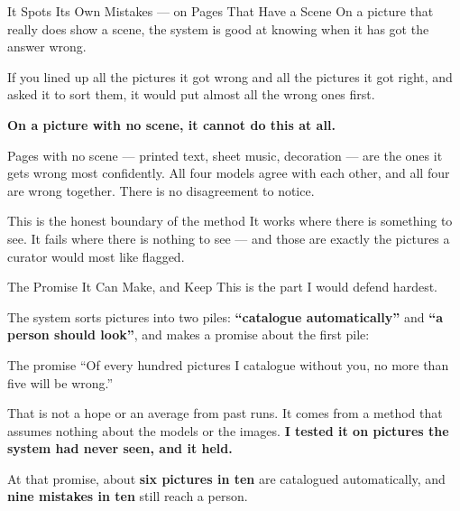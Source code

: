 \documentclass[aspectratio=169,11pt]{beamer}
\begin{document}
\begin{frame}{It Spots Its Own Mistakes --- on Pages That Have a Scene}
\normalsize
On a picture that really does show a scene, the system is good at knowing when it has got the answer wrong.
\vspace{3mm}

\small
If you lined up all the pictures it got wrong and all the pictures it got right, and asked it to sort them, it would put almost all the wrong ones first.
\vspace{4mm}

\normalsize
\textbf{On a picture with no scene, it cannot do this at all.}
\vspace{2mm}

\small
Pages with no scene --- printed text, sheet music, decoration --- are the ones it gets wrong most confidently. All four models agree with each other, and all four are wrong together. There is no disagreement to notice.
\vspace{4mm}

\begin{alertblock}{\small This is the honest boundary of the method}
It works where there is something to see. It fails where there is nothing to see --- and those are exactly the pictures a curator would most like flagged.
\end{alertblock}
\end{frame}

\begin{frame}{The Promise It Can Make, and Keep}
\normalsize
This is the part I would defend hardest.
\vspace{3mm}

\small
The system sorts pictures into two piles: \textbf{``catalogue automatically''} and \textbf{``a person should look''}, and makes a promise about the first pile:
\vspace{2mm}

\begin{exampleblock}{\normalsize The promise}
\normalsize ``Of every hundred pictures I catalogue without you, no more than five will be wrong.''
\end{exampleblock}
\vspace{3mm}

\small
That is not a hope or an average from past runs. It comes from a method that assumes nothing about the models or the images. \textbf{I tested it on pictures the system had never seen, and it held.}
\vspace{2mm}

At that promise, about \textbf{six pictures in ten} are catalogued automatically, and \textbf{nine mistakes in ten} still reach a person.
\end{frame}
\end{document}
